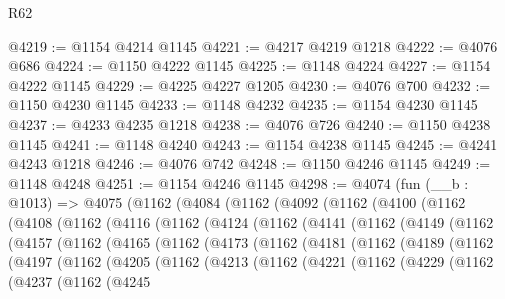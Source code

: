 \begin{lexlean}{R62}
\begin{coremodule}
@4219 := @1154 @4214 @1145
@4221 := @4217 @4219 @1218
@4222 := @4076 @686
@4224 := @1150 @4222 @1145
@4225 := @1148 @4224
@4227 := @1154 @4222 @1145
@4229 := @4225 @4227 @1205
@4230 := @4076 @700
@4232 := @1150 @4230 @1145
@4233 := @1148 @4232
@4235 := @1154 @4230 @1145
@4237 := @4233 @4235 @1218
@4238 := @4076 @726
@4240 := @1150 @4238 @1145
@4241 := @1148 @4240
@4243 := @1154 @4238 @1145
@4245 := @4241 @4243 @1218
@4246 := @4076 @742
@4248 := @1150 @4246 @1145
@4249 := @1148 @4248
@4251 := @1154 @4246 @1145
@4298 := @4074
    (fun (__b : @1013) =>
    @4075
      (@1162
        (@4084
          (@1162
            (@4092
              (@1162
                (@4100
                  (@1162
                    (@4108
                      (@1162
                        (@4116
                          (@1162
                            (@4124
                              (@1162
                                (@4141
                                  (@1162
                                    (@4149
                                      (@1162
                                        (@4157
                                          (@1162
                                            (@4165
                                              (@1162
                                                (@4173
                                                  (@1162
                                                    (@4181
                                                      (@1162
                                                        (@4189
                                                          (@1162
                                                            (@4197
                                                              (@1162
                                                                (@4205
                                                                  (@1162
                                                                    (@4213
                                                                      (@1162
                                                                        (@4221
                                                                          (@1162
                                                                            (@4229
                                                                              (@1162
                                                                                (@4237
                                                                                  (@1162
                                                                                    (@4245

\end{coremodule}
\end{lexlean}
